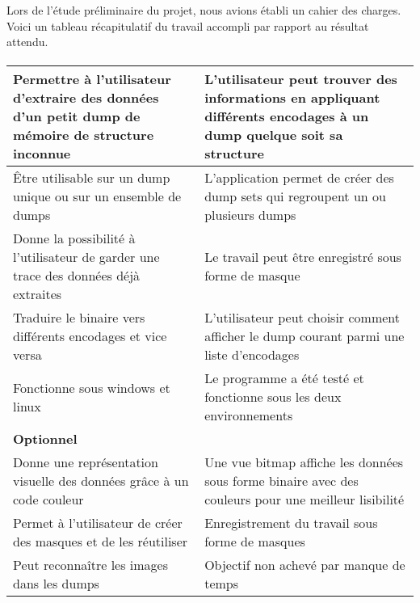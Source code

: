 Lors de l'étude préliminaire du projet, nous avions établi un cahier des charges. Voici un tableau récapitulatif du travail accompli par rapport au résultat attendu.
\paragraph{}

\begin{tabular}{|p{6cm}|p{6cm}|}
  \hline
  Permettre à l'utilisateur d'extraire des données d'un petit dump de mémoire de structure inconnue &
  L'utilisateur peut trouver des informations en appliquant différents encodages à un dump quelque soit sa structure
  \\ \hline
  Être utilisable sur un dump unique ou sur un ensemble de dumps &
  L'application permet de créer des dump sets qui regroupent un ou plusieurs dumps
  \\ \hline
  Donne la possibilité à l'utilisateur de garder une trace des données déjà extraites &
  Le travail peut être enregistré sous forme de masque
  \\ \hline
  Traduire le binaire vers différents encodages et vice versa &
  L'utilisateur peut choisir comment afficher le dump courant parmi une liste d'encodages
  \\ \hline
  Fonctionne sous windows et linux &
  Le programme a été testé et fonctionne sous les deux environnements
  \\ \hline \hline
  \textbf{Optionnel} &
  \\ \hline
  Donne une représentation visuelle des données grâce à un code couleur &
  Une vue bitmap affiche les données sous forme binaire avec des couleurs pour une meilleur lisibilité
  \\ \hline
  Permet à l'utilisateur de créer des masques et de les réutiliser &
  Enregistrement du travail sous forme de masques
  \\ \hline
  Peut reconnaître les images dans les dumps &
  Objectif non achevé par manque de temps
  \\ \hline
\end{tabular}
